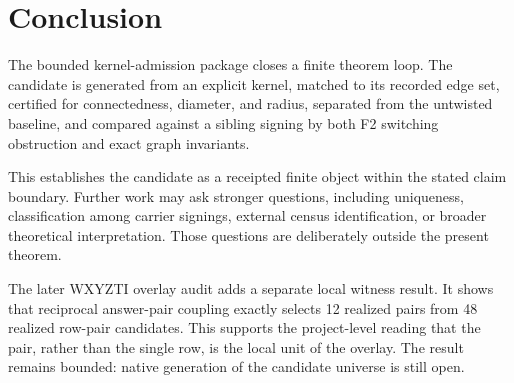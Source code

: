\section{Conclusion}

The bounded kernel-admission package closes a finite theorem loop. The candidate is generated from an explicit kernel, matched to its recorded edge set, certified for connectedness, diameter, and radius, separated from the untwisted baseline, and compared against a sibling signing by both F2 switching obstruction and exact graph invariants.

This establishes the candidate as a receipted finite object within the stated claim boundary. Further work may ask stronger questions, including uniqueness, classification among carrier signings, external census identification, or broader theoretical interpretation. Those questions are deliberately outside the present theorem.


The later WXYZTI overlay audit adds a separate local witness result. It shows that reciprocal answer-pair coupling exactly selects 12 realized pairs from 48 realized row-pair candidates. This supports the project-level reading that the pair, rather than the single row, is the local unit of the overlay. The result remains bounded: native generation of the candidate universe is still open.

